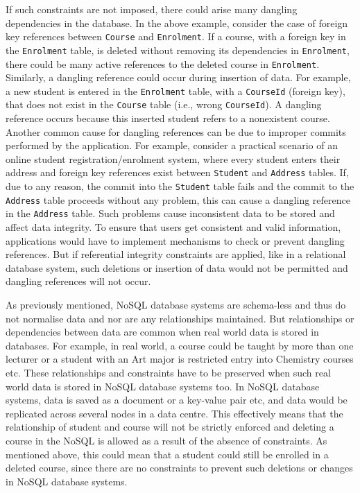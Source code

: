 If such constraints are not imposed, there could arise many dangling
dependencies in the database. In the above example, consider the case of foreign
key references between \texttt{Course} and \texttt{Enrolment}. If a course, with
a foreign key in the \texttt{Enrolment} table, is deleted without removing its
dependencies in \texttt{Enrolment}, there could be many active references to the
deleted course in \texttt{Enrolment}. Similarly, a dangling reference could
occur during insertion of data. For example, a new student is entered in the
\texttt{Enrolment} table, with a \texttt{CourseId} (foreign key), that does not
exist in the \texttt{Course} table (i.e., wrong \texttt{CourseId}). A dangling
reference occurs because this inserted student refers to a nonexistent course.
Another common cause for dangling references can be due to improper commits
performed by the application. For example, consider a practical scenario of an
online student registration/enrolment system, where every student enters their
address and foreign key references exist between \texttt{Student} and
\texttt{Address} tables.
If, due to any reason, the commit into the \texttt{Student} table fails and the
commit to the \texttt{Address} table proceeds without any problem, this can
cause a dangling reference in the \texttt{Address} table. Such problems cause inconsistent data to be stored and
affect data integrity. To ensure that users get consistent and valid
information, applications would have to implement mechanisms to check or prevent
dangling references. But if referential integrity constraints are applied, like
in a relational database system, such deletions or insertion of data would not
be permitted and dangling references will not occur.

As previously mentioned, \ac{NoSQL} database systems are schema-less and thus do
not normalise data and nor are any relationships maintained. But relationships or dependencies between data
are common when real world data is stored in databases. For example, in real
world, a course could be taught by more than one lecturer or a student with an
Art major is restricted entry into Chemistry courses etc. These relationships
and constraints have to be preserved when such real world data is stored in
\ac{NoSQL} database systems too. In \ac{NoSQL} database systems, data is saved as a
document or a key-value pair etc, and data would be replicated across several
nodes in a data centre. This effectively means that the relationship of student
and course will not be strictly enforced and deleting a course in the \ac{NoSQL} is
allowed as a result of the absence of constraints. As mentioned above, this
could mean that a student could still be enrolled in a deleted course, since
there are no constraints to prevent such deletions or changes in \ac{NoSQL} database
systems.

